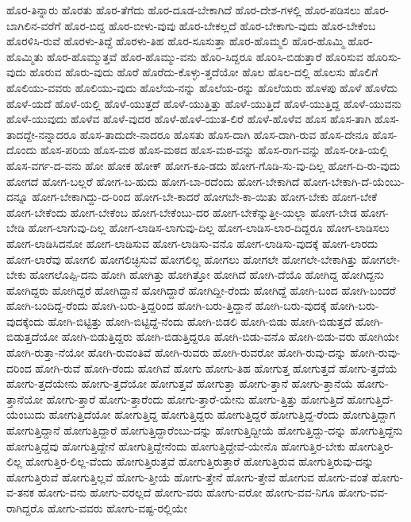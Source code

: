 {ಹೊರ-ತಿನ್ನಾರು
ಹೊರತು
ಹೊರ-ತೆಗೆದು
ಹೊರ-ದೂಡ-ಬೇಕಾಗಿದೆ
ಹೊರ-ದೇಶ-ಗಳಲ್ಲಿ
ಹೊರ-ಪಡಿಸಲು
ಹೊರ-ಬಾಗಿಲಿನ-ವರೆಗೆ
ಹೊರ-ಬಿದ್ದ
ಹೊರ-ಬೀಳು-ವುವು
ಹೊರ-ಬೇಕಲ್ಲದೆ
ಹೊರ-ಬೇಕಾಗು-ವುದು
ಹೊರ-ಬೇಕೆಂಬ
ಹೊರಳಿಸಿ-ರುವೆ
ಹೊರಳು-ತಿದ್ದೆ
ಹೊರಳು-ತಿಹ
ಹೊರ-ಸೂಸುತ್ತಾ
ಹೊರ-ಹೊಮ್ಮಲಿ
ಹೊರ-ಹೊಮ್ಮಿ
ಹೊರ-ಹೊಮ್ಮಿತು
ಹೊರ-ಹೊಮ್ಮುತ್ತವೆ
ಹೊರ-ಹೊಮ್ಮು-ವನು
ಹೊರಿ-ಸಿದ್ದರೂ
ಹೊರಿಸಿ-ಬಿಡುತ್ತಾರೆ
ಹೊರಿಸುವ
ಹೊರಿಸು-ವುದು
ಹೊರುವ
ಹೊರು-ವುದು
ಹೊರೆ
ಹೊರೆದು-ಕೊಳ್ಳು-ತ್ತದೆಯೋ
ಹೊಲ
ಹೊಲ-ದಲ್ಲಿ
ಹೊಲಸು
ಹೊಲಿಗೆ
ಹೊಲಿಯು-ವವರು
ಹೊಲಿಯು-ವುದು
ಹೊಲೆಯ-ನನ್ನು
ಹೊಲೆಯ-ರನ್ನು
ಹೊಲೆಯರು
ಹೊಳಪು
ಹೊಳೆ
ಹೊಳೆದು
ಹೊಳೆ-ಯದೆ
ಹೊಳೆ-ಯಲ್ಲಿ
ಹೊಳೆ-ಯುತ್ತದೆ
ಹೊಳೆ-ಯುತ್ತಿತ್ತು
ಹೊಳೆ-ಯುತ್ತಿದೆ
ಹೊಳೆ-ಯುತ್ತಿದ್ದ
ಹೊಳೆ-ಯುವನು
ಹೊಳೆ-ಯುವುದು
ಹೊಳೆವ
ಹೊಳೆ-ವುದರ
ಹೊಳೆ-ಹೊಳೆ-ಯುತ-ಲಿರೆ
ಹೊಳೆ-ಹೊಳೆವ
ಹೊಸ
ಹೊಸ-ತಾಗಿ
ಹೊಸ-ತಾದದ್ದೇ-ನನ್ನಾದರೂ
ಹೊಸ-ತಾದುದೇ-ನಾದರೂ
ಹೊಸತು
ಹೊಸ-ದಾಗಿ
ಹೊಸ-ದಾಗಿ-ರುವ
ಹೊಸ-ದೇನೂ
ಹೊಸ-ದೊಂದು
ಹೊಸ-ಪರಿಯ
ಹೊಸ-ಮಠ
ಹೊಸ-ಮಠದ
ಹೊಸ-ಮಠ-ವನ್ನು
ಹೊಸ-ರಾಗ-ವನ್ನು
ಹೊಸ-ರೀತಿ-ಯಲ್ಲಿ
ಹೊಸ-ವರ್ಗ-ದ-ವನು
ಹೋ
ಹೋಕ
ಹೋಕ್
ಹೋಗ-ಕೂ-ಡದು
ಹೋಗ-ಗೊಡಿ-ಸು-ವು-ದಿಲ್ಲ
ಹೋಗ-ದಿ-ರು-ವುದು
ಹೋಗದೆ
ಹೋಗ-ಬಲ್ಲರೆ
ಹೋಗ-ಬ-ಹುದು
ಹೋಗ-ಬಾ-ರದೆಂದು
ಹೋಗ-ಬೇಕಾಗಿದೆ
ಹೋಗ-ಬೇಕಾಗಿ-ದೆ-ಯೆಂಬು-ದನ್ನೂ
ಹೋಗ-ಬೇಕಾಗಿದ್ದು-ದ-ರಿಂದ
ಹೋಗ-ಬೇ-ಕಾದರೆ
ಹೋಗಬೇ-ಕಾ-ಯಿತು
ಹೋಗ-ಬೇಕು
ಹೋಗ-ಬೇಕೆ
ಹೋಗ-ಬೇಕೆಂದು
ಹೋಗ-ಬೇಕೆಂಬ
ಹೋಗ-ಬೇಕೆಂಬು-ದರ
ಹೋಗ-ಬೇಕೆನ್ನುತ್ತೀ-ಯಲ್ಲಾ
ಹೋಗ-ಬೇಡ
ಹೋಗ-ಬೇಡಿ
ಹೋಗ-ಲಾಗುವು-ದಿಲ್ಲ
ಹೋಗ-ಲಾಡಿಸ-ಲಾಗುವು-ದಿಲ್ಲ
ಹೋಗ-ಲಾಡಿಸ-ಲಾರ-ದಿದ್ದರೂ
ಹೋಗ-ಲಾಡಿಸಲು
ಹೋಗ-ಲಾಡಿಸಿದನೋ
ಹೋಗ-ಲಾಡಿಸುವ
ಹೋಗ-ಲಾಡಿಸು-ವನೊ
ಹೋಗ-ಲಾಡಿಸು-ವುದಕ್ಕೆ
ಹೋಗ-ಲಾರದು
ಹೋಗ-ಲಾರೆವು
ಹೋಗಲಿ
ಹೋಗಲಿಚ್ಛಿಸುವೆ
ಹೋಗಲಿಲ್ಲ
ಹೋಗಲು
ಹೋಗಲೇ
ಹೋಗಲೇ-ಬೇಕಾಗಿತ್ತು
ಹೋಗಲೇ-ಬೇಕು
ಹೋಗಲೊಪ್ಪಿ-ದನು
ಹೋಗಿ
ಹೋಗಿತ್ತು
ಹೋಗಿತ್ತೋ
ಹೋಗಿದೆ
ಹೋಗಿ-ದೆಯೊ
ಹೋಗಿದ್ದ
ಹೋಗಿದ್ದನು
ಹೋಗಿದ್ದರು
ಹೋಗಿದ್ದರೆ
ಹೋಗಿದ್ದಾನೆ
ಹೋಗಿದ್ದಾರೆ
ಹೋಗಿದ್ದೀ-ರೆಂದು
ಹೋಗಿದ್ದೆ
ಹೋಗಿ-ಬಂದ
ಹೋಗಿ-ಬಂದರೆ
ಹೋಗಿ-ಬಂದಿದ್ದ-ರೆಂದು
ಹೋಗಿ-ಬರು-ತ್ತಿದ್ದರಿಂದ
ಹೋಗಿ-ಬರು-ತ್ತಿದ್ದಾನೆ
ಹೋಗಿ-ಬರು-ವುದಕ್ಕೆ
ಹೋಗಿ-ಬರು-ವುದಕ್ಕೆಂದು
ಹೋಗಿ-ಬಿಟ್ಟಿತ್ತು
ಹೋಗಿ-ಬಿಟ್ಟಿದ್ದೆ-ನೆಂದು
ಹೋಗಿ-ಬಿಡಲಿ
ಹೋಗಿ-ಬಿಡು
ಹೋಗಿ-ಬಿಡುತ್ತದೆ
ಹೋಗಿ-ಬಿಡುತ್ತದೆಯೋ
ಹೋಗಿ-ಬಿಡುತ್ತಿದ್ದರು
ಹೋಗಿ-ಬಿಡುತ್ತಿದ್ದರೂ
ಹೋಗಿ-ಬಿಡು-ವನೊ
ಹೋಗಿ-ಬಿಡು-ವರು
ಹೋಗಿಯೇ
ಹೋಗಿ-ರುತ್ತಾ-ನೆಯೋ
ಹೋಗಿ-ರುವಂತಿವೆ
ಹೋಗಿ-ರುವರು
ಹೋಗಿ-ರುವರೋ
ಹೋಗಿ-ರುವು-ದನ್ನು
ಹೋಗಿ-ರುವು-ದರಿಂದ
ಹೋಗಿ-ರುವೆ
ಹೋಗಿ-ರೆಂದು
ಹೋಗಿವೆ
ಹೋಗು
ಹೋಗು-ತಿಹ
ಹೋಗುತ್ತ
ಹೋಗುತ್ತದೆ
ಹೋಗು-ತ್ತದೆಯೆ
ಹೋಗು-ತ್ತದೆಯೇನು
ಹೋಗು-ತ್ತದೆಯೋ
ಹೋಗುತ್ತವೆ
ಹೋಗುತ್ತಾ
ಹೋಗು-ತ್ತಾನೆ
ಹೋಗು-ತ್ತಾನೆಯೆ
ಹೋಗು-ತ್ತಾನೆಯೋ
ಹೋಗು-ತ್ತಾರೆ
ಹೋಗು-ತ್ತಾರೆಂದು
ಹೋಗು-ತ್ತಾರೆ-ಯೇನು
ಹೋಗು-ತ್ತಿತ್ತು
ಹೋಗುತ್ತಿದೆ
ಹೋಗುತ್ತಿದೆ-ಯೆಂಬುದು
ಹೋಗುತ್ತಿದೆಯೋ
ಹೋಗುತ್ತಿದ್ದ
ಹೋಗುತ್ತಿದ್ದರು
ಹೋಗುತ್ತಿದ್ದರೆ
ಹೋಗುತ್ತಿದ್ದ-ರೆಂದು
ಹೋಗುತ್ತಿದ್ದಾಗ
ಹೋಗುತ್ತಿದ್ದಾನೆ
ಹೋಗುತ್ತಿದ್ದಾರೆ
ಹೋಗುತ್ತಿದ್ದಾರೆಂಬು-ದನ್ನು
ಹೋಗುತ್ತಿದ್ದೀಯೆ
ಹೋಗುತ್ತಿದ್ದು-ದನ್ನು
ಹೋಗುತ್ತಿದ್ದೆನು
ಹೋಗುತ್ತಿದ್ದೆವು
ಹೋಗುತ್ತಿದ್ದೇನೆ
ಹೋಗುತ್ತಿದ್ದೇನೆಂದು
ಹೋಗುತ್ತಿದ್ದೇವೆ-ಯೇನೊ
ಹೋಗುತ್ತಿರ-ಬೇಕು
ಹೋಗುತ್ತಿರ-ಲಿಲ್ಲ
ಹೋಗುತ್ತಿರ-ಲಿಲ್ಲ-ವೆಂದು
ಹೋಗುತ್ತಿರುತ್ತವೆ
ಹೋಗುತ್ತಿರುತ್ತಾರೆ
ಹೋಗುತ್ತಿರುವ
ಹೋಗುತ್ತಿರುವು-ದನ್ನು
ಹೋಗುತ್ತಿರುವೆ
ಹೋಗುತ್ತಿಲ್ಲವೆ
ಹೋಗು-ತ್ತೀಯೆ
ಹೋಗು-ತ್ತೇನೆ
ಹೋಗು-ತ್ತೇವೆ
ಹೋಗುವ
ಹೋಗು-ವಂತೆ
ಹೋಗು-ವ-ತನಕ
ಹೋಗು-ವನು
ಹೋಗು-ವರಲ್ಲದೆ
ಹೋಗು-ವರು
ಹೋಗು-ವರೋ
ಹೋಗು-ವವ-ನಿಗೂ
ಹೋಗು-ವವ-ರಾಗಿದ್ದರೊ
ಹೋಗು-ವವರು
ಹೋಗು-ವಷ್ಟ-ರಲ್ಲಿಯೇ
}
